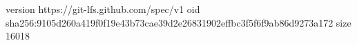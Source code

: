 version https://git-lfs.github.com/spec/v1
oid sha256:9105d260a419f0f19e43b73cae39d2e26831902effbc3f5f6f9ab86d9273a172
size 16018
